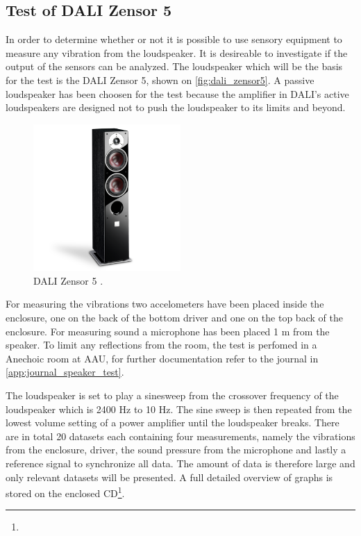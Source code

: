 \subsection*{Test of DALI Zensor 5}
In order to determine whether or not it is possible to use sensory equipment to measure any vibration from the loudspeaker. It is desireable to investigate if the output of the sensors can be analyzed. The loudspeaker which will be the basis for the test is the DALI Zensor 5, shown on \autoref{fig:dali_zensor5}. A passive loudspeaker has been choosen for the test because the amplifier in DALI's active loudspeakers are designed not to push the loudspeaker to its limits and beyond. %

\begin{figure}[H]
\centering
\includegraphics[width=0.5\textwidth]{figures/zensor5.png}
\caption{DALI Zensor 5 \citep{sou:daliZensor5}.}
\label{fig:dali_zensor5}
\end{figure}


For measuring the vibrations two accelometers have been placed inside the enclosure, one on the back of the bottom driver and one on the top back of the enclosure. For measuring sound a microphone has been placed 1 m from the speaker. To limit any reflections from the room, the test is perfomed in a Anechoic room at \gls{AAU}, for further documentation refer to the journal in \autoref{app:journal_speaker_test}.  



The loudspeaker is set to play a sinesweep from the crossover frequency of the loudspeaker which is 2400 Hz to 10 Hz. The sine sweep is then repeated from the lowest volume setting of a power amplifier until the loudspeaker breaks. There are in total 20 datasets each containing four measurements, namely the vibrations from the enclosure, driver, the sound pressure from the microphone and lastly a reference signal to synchronize all data. The amount of data is therefore large and only relevant datasets will be presented.  A full detailed overview of graphs is stored on the enclosed CD\footnote{}.



